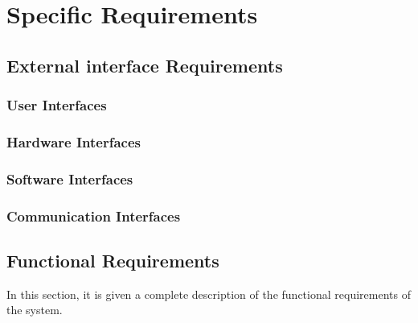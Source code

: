 \chapter{Specific Requirements}

\section{External interface Requirements}
\subsection{User Interfaces}
\subsection{Hardware Interfaces}
\subsection{Software Interfaces}
\subsection{Communication Interfaces}
\clearpage

\section{Functional Requirements}
In this section, it is given a complete description of the functional requirements of the system.

